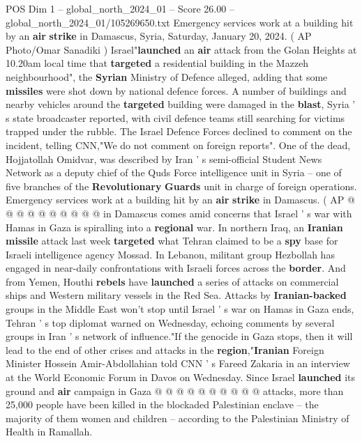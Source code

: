\begin{textsample}{POS Dim 1 – global\_north\_2024\_01 – Score 26.00 – global\_north\_2024\_01/105269650.txt}  \label{ex:f1_pos_130}
Emergency services work at a building hit by an \textbf{air} \textbf{strike} in Damascus, Syria, Saturday, January 20, 2024. ( AP Photo/Omar Sanadiki ) Israel"\textbf{launched} an \textbf{air} attack from the Golan Heights at 10.20am local time that \textbf{targeted} a residential building in the Mazzeh neighbourhood", the \textbf{Syrian} Ministry of Defence alleged, adding that some \textbf{missiles} were shot down by national defence forces.
A number of buildings and nearby vehicles around the \textbf{targeted} building were damaged in the \textbf{blast}, Syria ' s state broadcaster reported, with civil defence teams still searching for victims trapped under the rubble.
The Israel Defence Forces declined to comment on the incident, telling CNN,"We do not comment on foreign reports".
One of the dead, Hojjatollah Omidvar, was described by Iran ' s semi-official Student News Network as a deputy chief of the Quds Force intelligence unit in Syria -- one of five branches of the \textbf{Revolutionary} \textbf{Guards} unit in charge of foreign operations.
Emergency services work at a building hit by an \textbf{air} \textbf{strike} in Damascus. ( AP @ @ @ @ @ @ @ @ @ @ in Damascus comes amid concerns that Israel ' s war with Hamas in Gaza is spiralling into a \textbf{regional} war.
In northern Iraq, an \textbf{Iranian} \textbf{missile} attack last week \textbf{targeted} what Tehran claimed to be a \textbf{spy} base for Israeli intelligence agency Mossad.
In Lebanon, militant group Hezbollah has engaged in near-daily confrontations with Israeli forces across the \textbf{border}.
And from Yemen, Houthi \textbf{rebels} have \textbf{launched} a series of attacks on commercial ships and Western military vessels in the Red Sea.
Attacks by \textbf{Iranian-backed} groups in the Middle East won't stop until Israel ' s war on Hamas in Gaza ends, Tehran ' s top diplomat warned on Wednesday, echoing comments by several groups in Iran ' s network of influence."If the genocide in Gaza stops, then it will lead to the end of other crises and attacks in the \textbf{region},"\textbf{Iranian} Foreign Minister Hossein Amir-Abdollahian told CNN ' s Fareed Zakaria in an interview at the World Economic Forum in Davos on Wednesday.
Since Israel \textbf{launched} its ground and \textbf{air} campaign in Gaza @ @ @ @ @ @ @ @ @ @ attacks, more than 25,000 people have been killed in the blockaded Palestinian enclave -- the majority of them women and children -- according to the Palestinian Ministry of Health in Ramallah.

\end{textsample}

